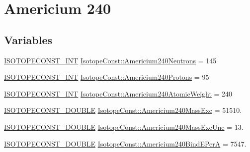 \hypertarget{group___isotope_const-_americium-_am240}{}\section{Americium 240}
\label{group___isotope_const-_americium-_am240}
\subsection*{Variables}
\begin{DoxyCompactItemize}
\item 
\mbox{\hyperlink{group___isotope_const-_macros_ga5f18360b3e99483a35c32d789e62621c}{I\+S\+O\+T\+O\+P\+E\+C\+O\+N\+S\+T\+\_\+\+I\+NT}} \mbox{\hyperlink{group___isotope_const-_americium-_am240_gac0b793dd5556297902f23a1d4d5f3d8a}{Isotope\+Const\+::\+Americium240\+Neutrons}} = 145
\item 
\mbox{\hyperlink{group___isotope_const-_macros_ga5f18360b3e99483a35c32d789e62621c}{I\+S\+O\+T\+O\+P\+E\+C\+O\+N\+S\+T\+\_\+\+I\+NT}} \mbox{\hyperlink{group___isotope_const-_americium-_am240_ga3bd7e460c388997c7329af5ac989be69}{Isotope\+Const\+::\+Americium240\+Protons}} = 95
\item 
\mbox{\hyperlink{group___isotope_const-_macros_ga5f18360b3e99483a35c32d789e62621c}{I\+S\+O\+T\+O\+P\+E\+C\+O\+N\+S\+T\+\_\+\+I\+NT}} \mbox{\hyperlink{group___isotope_const-_americium-_am240_ga1ab7d65cb74181908d9c0286518e403e}{Isotope\+Const\+::\+Americium240\+Atomic\+Weight}} = 240
\item 
\mbox{\hyperlink{group___isotope_const-_macros_ga8f45a7272ce02c0b4c65c44636ed719a}{I\+S\+O\+T\+O\+P\+E\+C\+O\+N\+S\+T\+\_\+\+D\+O\+U\+B\+LE}} \mbox{\hyperlink{group___isotope_const-_americium-_am240_gaf7e3bf12a5f71d1627bee502b9e00f59}{Isotope\+Const\+::\+Americium240\+Mass\+Exc}} = 51510.
\item 
\mbox{\hyperlink{group___isotope_const-_macros_ga8f45a7272ce02c0b4c65c44636ed719a}{I\+S\+O\+T\+O\+P\+E\+C\+O\+N\+S\+T\+\_\+\+D\+O\+U\+B\+LE}} \mbox{\hyperlink{group___isotope_const-_americium-_am240_gad00d30b30875898eeea63828c254d3be}{Isotope\+Const\+::\+Americium240\+Mass\+Exc\+Unc}} = 13.
\item 
\mbox{\hyperlink{group___isotope_const-_macros_ga8f45a7272ce02c0b4c65c44636ed719a}{I\+S\+O\+T\+O\+P\+E\+C\+O\+N\+S\+T\+\_\+\+D\+O\+U\+B\+LE}} \mbox{\hyperlink{group___isotope_const-_americium-_am240_ga9a273e7849b307b8c7bc29c30e0104c2}{Isotope\+Const\+::\+Americium240\+Bind\+E\+PerA}} = 7547.
\item 

\end{DoxyCompactItemize}
